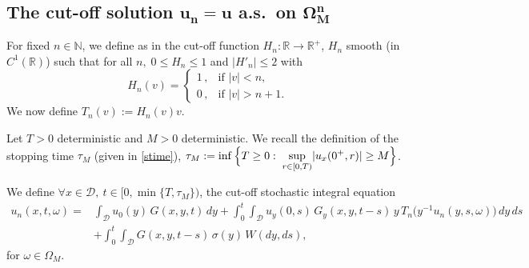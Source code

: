\documentclass[reqno]{amsart}
\numberwithin{equation}{section}
\newcommand{\mN}{\mathbb{N}}
\newcommand{\cd}{\mathcal{D}}
\newcommand{\ch}{\mathcal{H}}
\begin{document}
\subsection{The cut-off solution $\mathbf{u_n=u}$ a.s.\ on $ \mathbf{\Omega_M^n}$}
For fixed $n\in\mN$, we define as in \cite{web,JDE18} the cut-off function
$H_n:\mathbb R\rightarrow\mathbb{R}^+$, $H_n$ smooth (in $ C^1(\mathbb R)$) such that for all $n,\; 0 \leq H_n\leq 1$ and $ |H'_n|\leq 2$ with
$$H_n(v)=
\begin{cases}
1\,, & \text{if }|v|<n, \\
0\,, & \text{if }|v|>n+1.
\end{cases}$$
We now define $T_n(v):=H_n(v)v$.

%

Let $T>0$ deterministic and $M>0$ deterministic. We recall the
definition of the stopping time $\tau_M$ (given in \eqref{stime}),
$\tau_M:=\inf\Big{\{}T\geq 0:\;\displaystyle{\sup_{r\in[0,T)}}
|u_x(0^+,r)|\geq M\Big{\}}$.

We define $\forall x\in\cd,\ t\in[0,\min\{T,\tau_M\})$, the cut-off stochastic integral equation
\begin{equation}\label{coint}
\begin{split}
u_n(x,t,\omega) =& \int_{\mathcal D} u_0(y) \, G(x,y,t) \, dy + \int_0^t\int_{\mathcal D} u_y(0,s) \, G_y(x,y,t-s) \,y\, T_n \bigl(y^{-1}u_n(y,s,\omega)\bigr)\, dy\,ds
\\[0.2cm]
&+\int_0^t\int_{\cd}G(x,y,t-s) \, \sigma(y) \, W(dy,ds),
\end{split}
\end{equation}
for $\omega\in\Omega_M$. %
\end{document}
